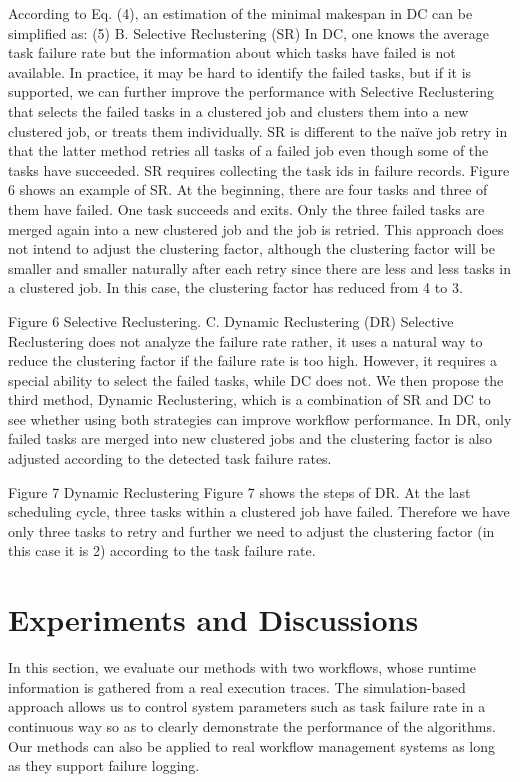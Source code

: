 \documentclass{IOS-Book-Article}
\begin{document}
According to Eq. (4), an estimation of the minimal makespan in DC can be simplified as:
                                             (5)
B.	Selective Reclustering (SR)
In DC, one knows the average task failure rate but the information about which tasks have failed is not available. In practice, it may be hard to identify the failed tasks, but if it is supported, we can further improve the performance with Selective Reclustering that selects the failed tasks in a clustered job and clusters them into a new clustered job, or treats them individually. SR is different to the naïve job retry in that the latter method retries all tasks of a failed job even though some of the tasks have succeeded. SR requires collecting the task ids in failure records. 
Figure 6 shows an example of SR. At the beginning, there are four tasks and three of them have failed. One task succeeds and exits. Only the three failed tasks are merged again into a new clustered job and the job is retried. This approach does not intend to adjust the clustering factor, although the clustering factor will be smaller and smaller naturally after each retry since there are less and less tasks in a clustered job. In this case, the clustering factor has reduced from 4 to 3.
 
Figure 6	Selective Reclustering.
C.	Dynamic Reclustering (DR)
Selective Reclustering does not analyze the failure rate rather, it uses a natural way to reduce the clustering factor if the failure rate is too high. However, it requires a special ability to select the failed tasks, while DC does not. We then propose the third method, Dynamic Reclustering, which is a combination of SR and DC to see whether using both strategies can improve workflow performance. In DR, only failed tasks are merged into new clustered jobs and the clustering factor is also adjusted according to the detected task failure rates.
 
Figure 7	Dynamic Reclustering
Figure 7 shows the steps of DR. At the last scheduling cycle, three tasks within a clustered job have failed. Therefore we have only three tasks to retry and further we need to adjust the clustering factor (in this case it is 2) according to the task failure rate. 

\section{Experiments and Discussions}

In this section, we evaluate our methods with two workflows, whose runtime information is gathered from a real execution traces. The simulation-based approach allows us to control system parameters such as task failure rate in a continuous way so as to clearly demonstrate the performance of the algorithms. Our methods can also be applied to real workflow management systems as long as they support failure logging. 
\end{document}
